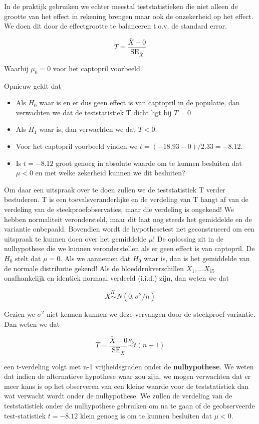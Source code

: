 \documentclass[
  12pt,dutch]{book}
\providecommand{\tightlist}{%
  \setlength{\itemsep}{0pt}\setlength{\parskip}{0pt}}
\theoremstyle{definition}
\theoremstyle{definition}
\theoremstyle{definition}
\theoremstyle{definition}
\theoremstyle{remark}
\begin{document}
In de praktijk gebruiken we echter meestal teststatistieken die niet alleen de grootte van het effect in rekening brengen maar ook de onzekerheid op het effect.
We doen dit door de effectgrootte te balanceren t.o.v. de standard error.

\[T=\frac{\bar{X}-0}{\text{SE}_{\bar X}}\]

Waarbij \(\mu_0=0\) voor het captopril voorbeeld.

Opnieuw geldt dat

\begin{itemize}
\tightlist
\item
  Als \(H_0\) waar is en er dus geen effect is van captopril in de populatie, dan verwachten we dat de teststatistiek T dicht ligt bij \(T=0\)
\item
  Als \(H_1\) waar is, dan verwachten we dat \(T<0\).
\item
  Voor het captopril voorbeeld vinden we \(t=(-18.93-0)/2.33=-8.12\).
\item
  Is \(t = -8.12\) groot genoeg in absolute waarde om te kunnen besluiten dat \(\mu < 0\) en met welke zekerheid kunnen we dit besluiten?
\end{itemize}

Om daar een uitspraak over te doen zullen we de teststatistiek T verder bestuderen.
T is een toevalsveranderlijke en de verdeling van T hangt af van de verdeling van de steekproefobservaties, maar die verdeling is ongekend!
We hebben normaliteit verondersteld, maar dit laat nog steeds het gemiddelde en de variantie onbepaald.
Bovendien wordt de hypothesetest net geconstrueerd om een uitspraak te kunnen doen over het gemiddelde \(\mu\)!
De oplossing zit in de nulhypothese die we kunnen veronderstellen als er geen effect is van captopril.
De \(H_0\) stelt dat \(\mu=0\).
Als we aannemen dat \(H_0\) waar is, dan is het gemiddelde van de normale distributie gekend!
Als de bloeddrukverschillen \(X_1, \ldots X_{15}\) onafhankelijk en identiek normaal verdeeld (i.i.d.) zijn, dan weten we dat

\[\bar X  \stackrel{H_0}{\sim} N(0, \sigma^2/n)\]

Gezien we \(\sigma^2\) niet kennen kunnen we deze vervangen door de steekproef variantie. Dan weten we dat

\[T=\frac{\bar{X}-0}{\text{SE}_{\bar X}}\stackrel{H_0}{\sim} t(n-1) \]

een t-verdeling volgt met n-1 vrijheidsgraden onder de \textbf{nulhypothese}.
We weten dat indien de alternatieve hypothese waar zou zijn, we mogen verwachten dat er meer kans is op het observeren van een kleine waarde voor de teststatistiek dan wat verwacht wordt onder de nulhypothese.
We zullen de verdeling van de teststatistiek onder de nulhypothese gebruiken om na te gaan of de geobserveerde test-statistiek \(t = -8.12\) klein genoeg is om te kunnen besluiten dat \(\mu < 0\).
\end{document}
